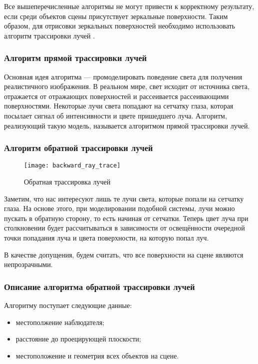 Все вышеперечисленные алгоритмы не могут привести к корректному результату, если среди объектов сцены присутствует зеркальные поверхности. Таким образом, для отрисовки зеркальных поверхностей необходимо использовать алгоритм трассировки лучей \cite{bib:computergraphics}.

\subsubsection{Алгоритм прямой трассировки лучей}
Основная идея алгоритма --- промоделировать поведение света для получения реалистичного изображения. В реальном мире, свет исходит от источника света, отражается от отражающих поверхностей и рассеивается рассеивающими поверхностями. Некоторые лучи света попадают на сетчатку глаза, которая посылает сигнал об интенсивности и цвете пришедшего луча. Алгоритм, реализующий такую модель, называется алгоритмом прямой трассировки лучей.

\subsubsection{Алгоритм обратной трассировки лучей}
\begin{figure}[ht]
	\centering
	\texttt{[image: backward\_ray\_trace]}
	\caption{Обратная трассировка лучей}
	\label{fig:backward_ray_trace}
\end{figure}

Заметим, что нас интересуют лишь те лучи света, которые попали на сетчатку глаза. На основе этого, при моделировании подобной системы, лучи можно пускать в обратную сторону, то есть начиная от сетчатки. Теперь цвет луча при столкновении будет рассчитываться в зависимости от освещённости очередной точки попадания луча и цвета поверхности, на которую попал луч.

В качестве допущения, будем считать, что все поверхности на сцене являются непрозрачными.

\subsubsection{Описание алгоритма обратной трассировки лучей}
Алгоритму поступает следующие данные:
\begin{itemize}
	\item местополжение наблюдателя;
	\item расстояние до проецирующей плоскости;
	\item местоположение и геометрия всех объектов на сцене.
\end{itemize}

